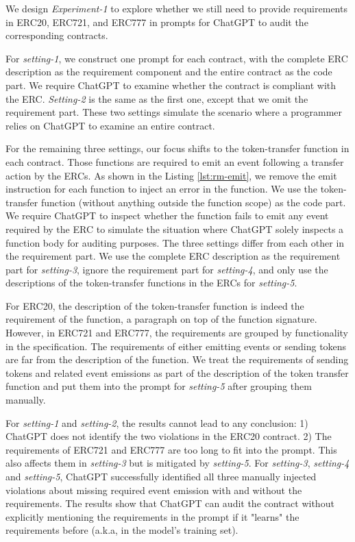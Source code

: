 

We design \textit{Experiment-1} to explore whether we 
still need to provide requirements in ERC20, ERC721, and ERC777 
in prompts for ChatGPT to audit the corresponding contracts.

For \textit{setting-1}, we construct one prompt for each contract, 
with the complete ERC description as the requirement component and the entire contract as 
the code part. We require ChatGPT
to examine whether the contract is compliant with the ERC.
\textit{Setting-2} is the same as the first one, except that we omit the requirement part. 
These two settings simulate the scenario where a programmer 
relies on ChatGPT to examine an entire contract.



For the remaining three settings, our focus shifts to the token-transfer function 
in each contract. Those
functions are required to emit an event following a transfer action by the ERCs. {\color{red} As shown in the Listing \ref{lst:rm-emit},}  we remove 
the emit instruction for each function to inject an error in the function.
We use the token-transfer function (without anything outside the function scope)
as the code part. We require ChatGPT to inspect whether 
the function fails to emit any event required by the ERC to
simulate the situation where ChatGPT solely inspects a function body for auditing purposes. 
The three settings differ from each other in the requirement part. 
We use the complete ERC description as the requirement part for \textit{setting-3}, 
ignore the requirement part for \textit{setting-4}, 
and only use the descriptions of the token-transfer functions in the ERCs for \textit{setting-5}. 

{\color{red} For ERC20, the description of the token-transfer function is indeed the requirement of the function, a paragraph on top of the function signature. 
However, in ERC721 and ERC777, the requirements are grouped by functionality in the specification. The requirements of either emitting events or sending tokens are far from the description of the function. We treat the requirements of sending tokens and related event emissions as part of the description of the token transfer function and put them into the prompt for \textit{setting-5} after grouping them manually.

For \textit{setting-1} and \textit{setting-2}, the results cannot lead to any conclusion: 1) ChatGPT does not identify the two violations in the ERC20 contract. 2) The requirements of ERC721 and ERC777 are too long to fit into the prompt. This also affects them in \textit{setting-3} but is mitigated by \textit{setting-5}.
For \textit{setting-3}, \textit{setting-4} and \textit{setting-5}, ChatGPT successfully identified all three manually injected violations about missing required event emission with and without the requirements. 
The results show that ChatGPT can audit the contract without explicitly mentioning the requirements in the prompt if it "learns" the requirements before (a.k.a, in the model's training set). 
}



